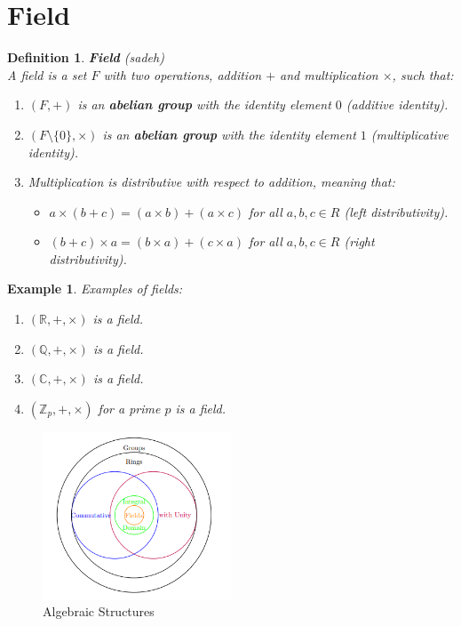 \documentclass[11pt]{book} %
\newtheorem{definition}{Definition}[section]
\newtheorem*{example*}{Example}
\begin{document}
\section{Field}
\begin{definition}{\textbf{Field} (sadeh)} \\
    A field is a set \(F\) with two operations, addition \(+\) and multiplication \(\times\), such that:
    \begin{enumerate}
        \item \( (F, +) \) is an \textbf{abelian group} with the identity element \(0\) (additive identity).
        \item \( (F \setminus \{0\}, \times) \) is an \textbf{abelian group} with the identity element \(1\) (multiplicative identity).
        \item Multiplication is distributive with respect to addition, meaning that:
        \begin{itemize}
            \item \(a \times (b + c) = (a \times b) + (a \times c)\) for all \(a, b, c \in R\) (left distributivity).
            \item \((b + c) \times a = (b \times a) + (c \times a)\) for all \(a, b, c \in R\) (right distributivity).
        \end{itemize}
    \end{enumerate}
\end{definition}

\begin{example*}
Examples of fields:
\begin{enumerate}
\item \( (\mathbb{R}, +, \times) \) is a field.
\item \( (\mathbb{Q}, +, \times) \) is a field.
\item \( (\mathbb{C}, +, \times) \) is a field.
\item \( (\mathbb{Z}_p, +, \times) \) for a prime \(p\) is a field.
\end{enumerate}
\end{example*}

\begin{figure}
    \centering
    \includegraphics[width=0.5\textwidth]{Figs/algebric_structures.png}
    \caption{Algebraic Structures}
\end{figure}
\end{document}
